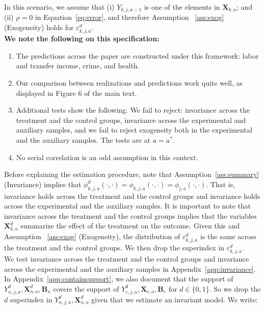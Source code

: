 \noindent In this scenario, we assume that (i)  $Y_{k,j,a-1}$ is one of the elements in $\bm{X}_{k,a}$; and (ii) $\rho = 0$ in Equation~\eqref{eq:error}, and therefore Assumption ~\ref{ass:exog} (Exogeneity) holds for $\varepsilon_{k,j,a}^d$.\\

\noindent \textbf{We note the following on this specification:}

\begin{enumerate}
 
\item The predictions across the paper are constructed under this framework: labor and transfer income, crime, and health. 
\item Our comparison between realizations and predictions work quite well, as displayed in Figure 6 of the main text. 
\item Additional tests show the following. We fail to reject: invariance across the treatment and the control groups, invariance across the experimental and auxiliary samples, and we fail to reject exogeneity both in the experimental and the auxiliary samples.  The tests are at $a = a^*$.
\item No serial correlation is an odd assumption in this context.
\end{enumerate}

\noindent Before explaining the estimation procedure, note that Assumption~\ref{ass:summary} (Invariance) implies that $\phi_{k,j,a}^d \left (\cdot, \cdot \right) = \phi_{k,j,a}  \left (\cdot, \cdot \right) = \phi_{j,a}  \left (\cdot, \cdot \right)$. That is, invariance holds across the treatment and the control groups and invariance holds across the experimental and the auxiliary samples. It is important to note that invariance across the treatment and the control groups implies that the variables $\bm{X}_{k,a}^d$ summarize the effect of the treatment on the outcome. Given this and Assumption ~\ref{ass:exog} (Exogeneity), the distribution of $\varepsilon_{k,j,a}^d$ is the same across the treatment and the control groups. We then drop the superindex in $\varepsilon_{k,j,a}^d$.\\ 

\noindent We test invariance across the treatment and the control groups and invariance across the experimental and the auxiliary samples  in Appendix~\ref{app:invariance}.\\

\noindent In Appendix~\ref{app:containsupport}, we also document that the support of $Y_{n,j,a}^d, \bm{X}_{n,a}^d, \bm{B}_{n}$ covers the support of $Y_{e,j,a}^d, \bm{X}_{e,a}, \bm{B}_{e}$ for $d \in \{0, 1\}$. So we drop the $d$ superindex in $Y_{n,j,a}^d, \bm{X}_{n,a}^d$ given that we estimate an invariant model. We write:

